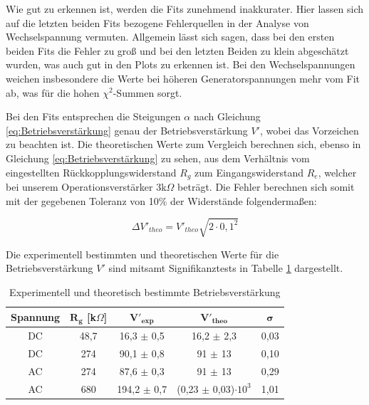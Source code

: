\documentclass{article}
\begin{document}
\phantom{.}

Wie gut zu erkennen ist, werden die Fits zunehmend inakkurater. Hier lassen sich auf die letzten beiden Fits bezogene Fehlerquellen in der Analyse von Wechselspannung vermuten. Allgemein lässt sich sagen, dass bei den ersten beiden Fits die Fehler zu groß und bei den letzten Beiden zu klein abgeschätzt wurden, was auch gut in den Plots zu erkennen ist. Bei den Wechselspannungen weichen insbesondere die Werte bei höheren Generatorspannungen mehr vom Fit ab, was für die hohen $\chi^2$-Summen sorgt.

Bei den Fits entsprechen die Steigungen $\alpha$ nach Gleichung \ref{eq:Betriebsverstärkung} genau der Betriebsverstärkung $V'$, wobei das Vorzeichen zu beachten ist. Die theoretischen Werte zum Vergleich berechnen sich, ebenso in Gleichung \ref{eq:Betriebsverstärkung} zu sehen, aus dem Verhältnis vom eingestellten Rückkopplungswiderstand $R_g$ zum Eingangswiderstand $R_e$, welcher bei unserem Operationsverstärker 3k$\Omega$ beträgt. Die Fehler berechnen sich somit mit der gegebenen Toleranz von 10\% der Widerstände folgendermaßen:

\begin{equation}
    \Delta V'_{theo} = V'_{theo} \sqrt{2 \cdot 0,1^2}
\end{equation}

Die experimentell bestimmten und theoretischen Werte für die Betriebsverstärkung $V'$ sind mitsamt Signifikanztests in Tabelle \ref{tab:A1-Betriebsverstärkung} dargestellt.

\phantom{.}

\begin{table}[!h]
    \centering
    \begin{tabular}{ccccc}
        \hline
        \textbf{Spannung} & $\bm{R_g}$ [k$\Omega$] & $\bm{V'_{exp}}$ & $\bm{V'_{theo}}$ & $\bm{\sigma}$  \\ \hline
         DC & 48,7 & 16,3 $\pm$ 0,5  & 16,2 $\pm$ 2,3 & 0,03 \\
         DC & 274  & 90,1 $\pm$ 0,8  & 91 $\pm$ 13 & 0,10 \\
         AC & 274  & 87,6 $\pm$ 0,3  & 91 $\pm$ 13 & 0,29 \\
         AC & 680  & 194,2 $\pm$ 0,7 & (0,23 $\pm$ 0,03)$\cdot 10^{3}$ & 1,01 \\ \hline
    \end{tabular}%
    \caption{Experimentell und theoretisch bestimmte Betriebsverstärkung}
    \label{tab:A1-Betriebsverstärkung}
\end{table}
\end{document}
